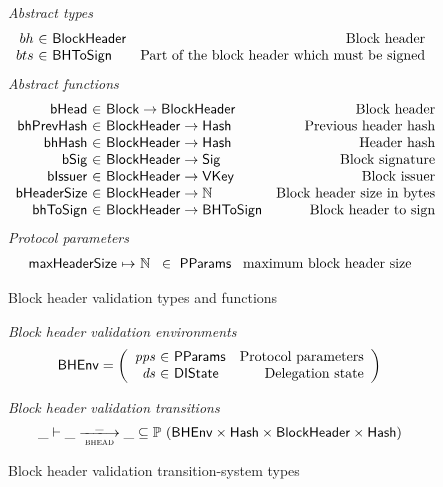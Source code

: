 \documentclass[11pt,a4paper]{article}
\newcommand{\powerset}[1]{\mathbb{P}~#1}
\newcommand{\var}[1]{\mathit{#1}}
\newcommand{\fun}[1]{\mathsf{#1}}
\newcommand{\type}[1]{\mathsf{#1}}
\newcommand{\trans}[2]{\xlongrightarrow[\textsc{#1}]{#2}}
\newcommand{\totalf}{\to}
\newcommand{\partialf}{\mapsto}
\newcommand{\Hash}{\type{Hash}}  %
\newcommand{\Block}{\type{Block}}
\newcommand{\VKey}{\type{VKey}}
\newcommand{\Sig}{\type{Sig}}
\newcommand{\DelegState}{\type{DIState}}
\newcommand{\ProtParams}{\type{PParams}} %
\newcommand{\bhdrsizename}{bHeaderSize}
\newcommand{\bsigname}{bSig}
\newcommand{\bissuername}{bIssuer}
\begin{document}
\begin{figure}[ht]
  \emph{Abstract types}
  \begin{equation*}
    \begin{array}{r@{~\in~}lr}
    bh & \Bhead & \text{Block header} \\
    bts & \Bhtosign & \text{Part of the block header which must be signed}
    \end{array}
  \end{equation*}
  \emph{Abstract functions}
  \begin{equation*}
    \begin{array}{r@{~\in~}lr}
    \fun{\bheadname} & \Block \totalf \Bhead & \text{Block header} \\
    \fun{\bhprevhashname} & \Bhead \totalf \Hash & \text{Previous header hash} \\
    \fun{\bhhashname} & \Bhead \totalf \Hash & \text{Header hash} \\
    \fun{\bsigname} & \Bhead \totalf \Sig & \text{Block signature} \\
    \fun{\bissuername} & \Bhead \totalf \VKey & \text{Block issuer} \\
    \fun{\bhdrsizename} & \Bhead \totalf \mathbb{N} & \text{Block header size in bytes}\\
    \fun{\bhtosignname} & \Bhead \totalf \Bhtosign & \text{Block header to sign}\\
    \end{array}
  \end{equation*}
  \emph{Protocol parameters}
  \begin{equation*}
    \begin{array}{r@{~\partialf~}l!{~\in~\ProtParams~}r}
    \maxheadersize & \mathbb{N} & \text{maximum block header size} \\
    \end{array}
  \end{equation*}
  \caption{Block header validation types and functions}
  \label{fig:defs:bhead}
\end{figure}

\begin{figure}[ht]
  \emph{Block header validation environments}
  \begin{equation*}
    \BHEnv =
    \left(
      \begin{array}{r@{~\in~}lr}
        \var{pps} & \ProtParams & \text{Protocol parameters} \\
        \var{ds} & \DelegState & \text{Delegation state} \\
      \end{array}
    \right)
  \end{equation*}

  \emph{Block header validation transitions}
  \begin{equation*}
    \_ \vdash \var{\_} \trans{bhead}{\_} \var{\_} \subseteq
    \powerset (\BHEnv \times \Hash \times \Bhead \times \Hash)
  \end{equation*}
  \caption{Block header validation transition-system types}
  \label{fig:ts-types:bhead}
\end{figure}
\end{document}

